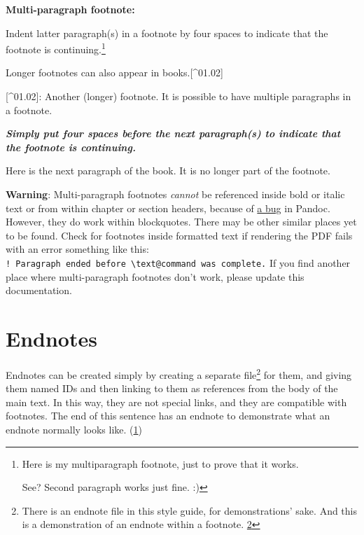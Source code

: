 \documentclass[
]{book}
\newenvironment{Shaded}{\begin{snugshade}}{\end{snugshade}}
\newcommand{\InformationTok}[1]{\textcolor[rgb]{0.56,0.35,0.01}{\textbf{\textit{#1}}}}
\newcommand{\NormalTok}[1]{#1}
\newcommand{\OtherTok}[1]{\textcolor[rgb]{0.56,0.35,0.01}{#1}}
\begin{document}
\textbf{Multi-paragraph footnote:}

Indent latter paragraph(s) in a footnote by four spaces to indicate that the footnote is continuing.\footnote{Here is my multiparagraph footnote, just to prove that it works.

  See? Second paragraph works just fine. :)}

\begin{Shaded}
\begin{Highlighting}[]
\NormalTok{Longer footnotes can also appear in books.}\OtherTok{[\^{}01.02]}

\OtherTok{[\^{}01.02]: }\NormalTok{Another (longer) footnote. It is possible to have multiple paragraphs in a footnote.}

\InformationTok{    Simply put four spaces before the next paragraph(s) to indicate that the footnote is continuing.}
  
\NormalTok{Here is the next paragraph of the book. It is no longer part of the footnote.}
\end{Highlighting}
\end{Shaded}

\textbf{Warning}: Multi-paragraph footnotes \emph{cannot} be referenced inside bold or italic text or from within chapter or section headers, because of \href{https://github.com/jgm/pandoc/issues/6733}{a bug} in Pandoc. However, they do work within blockquotes. There may be other similar places yet to be found. Check for footnotes inside formatted text if rendering the PDF fails with an error something like this: \texttt{!\ Paragraph\ ended\ before\ \textbackslash{}text@command\ was\ complete.} If you find another place where multi-paragraph footnotes don't work, please update this documentation.

\hypertarget{endnotes}{%
\section{Endnotes}\label{endnotes}}

Endnotes can be created simply by creating a separate file\footnote{There is an endnote file in this style guide, for demonstrations' sake. And this is a demonstration of an endnote within a footnote. \protect\hyperlink{en.02}{2}} for them, and giving them named IDs and then linking to them as references from the body of the main text. In this way, they are not special links, and they are compatible with footnotes. The end of this sentence has an endnote to demonstrate what an endnote normally looks like. (\protect\hyperlink{en.01}{1})
\end{document}
